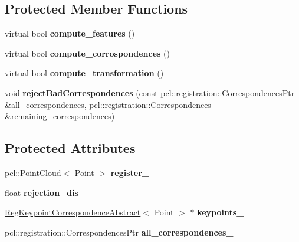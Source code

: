 \subsection*{Protected Member Functions}
\begin{DoxyCompactItemize}
\item 
\hypertarget{classRegistration__Corrospondence_ab1c6a8ed9e5348a145f2b434252b2539}{
virtual bool {\bfseries compute\_\-features} ()}
\label{classRegistration__Corrospondence_ab1c6a8ed9e5348a145f2b434252b2539}

\item 
\hypertarget{classRegistration__Corrospondence_a9a23608e726d2684f1e8f5813640bf19}{
virtual bool {\bfseries compute\_\-corrospondences} ()}
\label{classRegistration__Corrospondence_a9a23608e726d2684f1e8f5813640bf19}

\item 
\hypertarget{classRegistration__Corrospondence_ac7c2a2308d4927d5811077e91c253818}{
virtual bool {\bfseries compute\_\-transformation} ()}
\label{classRegistration__Corrospondence_ac7c2a2308d4927d5811077e91c253818}

\item 
\hypertarget{classRegistration__Corrospondence_a3dcc8134ad1f7c80ab135e5babff4ca8}{
void {\bfseries rejectBadCorrespondences} (const pcl::registration::CorrespondencesPtr \&all\_\-correspondences, pcl::registration::Correspondences \&remaining\_\-correspondences)}
\label{classRegistration__Corrospondence_a3dcc8134ad1f7c80ab135e5babff4ca8}

\end{DoxyCompactItemize}
\subsection*{Protected Attributes}
\begin{DoxyCompactItemize}
\item 
\hypertarget{classRegistration__Corrospondence_a930bedcad3a53b8616b15a0bb8b4afd1}{
pcl::PointCloud$<$ Point $>$ {\bfseries register\_\-}}
\label{classRegistration__Corrospondence_a930bedcad3a53b8616b15a0bb8b4afd1}

\item 
\hypertarget{classRegistration__Corrospondence_ab024cf1136295f16c4786c874b91e436}{
float {\bfseries rejection\_\-dis\_\-}}
\label{classRegistration__Corrospondence_ab024cf1136295f16c4786c874b91e436}

\item 
\hypertarget{classRegistration__Corrospondence_a10bf2e0005a1a7dbaa4daf43b1f8c8bf}{
\hyperlink{classRegKeypointCorrespondenceAbstract}{RegKeypointCorrespondenceAbstract}$<$ Point $>$ $\ast$ {\bfseries keypoints\_\-}}
\label{classRegistration__Corrospondence_a10bf2e0005a1a7dbaa4daf43b1f8c8bf}

\item 
\hypertarget{classRegistration__Corrospondence_a657b233d8150bf90131727f583f20c6f}{
pcl::registration::CorrespondencesPtr {\bfseries all\_\-correspondences\_\-}}
\label{classRegistration__Corrospondence_a657b233d8150bf90131727f583f20c6f}

\end{DoxyCompactItemize}
